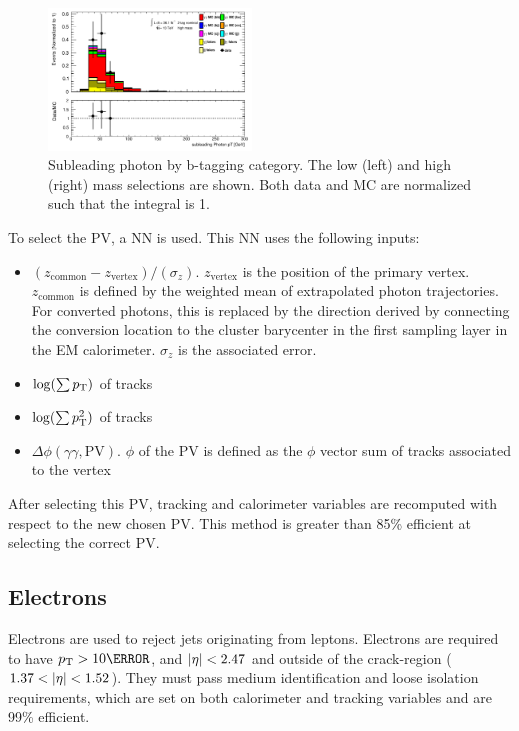 \begin{figure}[p]
  \includegraphics[width=0.48\textwidth]{chapters/chapter5_yybb/images/data_MC_comparison/h_SR_h_2t_nominal_subleadingPhoton_pt.pdf}
  \caption[Subleading photon \pt.]{Subleading photon \pt by b-tagging category. The low (left) and high (right) mass selections are shown. Both data and MC are normalized such that the integral is 1.
  \label{fig:photon_s_pt}}
\end{figure}

To select the \gls{PV}, a \gls{NN} is used. This \gls{NN} uses the following inputs:
\begin{itemize}
  \item $(z_{\text{common}} - z_{\text{vertex}})/(\sigma_z)$. $z_{\text{vertex}}$ is the position of the primary vertex. $z_{\text{common}}$ is defined by the weighted mean of extrapolated photon trajectories. For converted photons, this is replaced by the direction derived by connecting the conversion location to the cluster barycenter in the first sampling layer in the \gls{EM} calorimeter. $\sigma_z$ is the associated error.
  \item $\log(\sum p_{\text{T}})$ of tracks
  \item $\log(\sum p_{\text{T}}^2)$ of tracks
  \item $\Delta \phi(\gamma\gamma,\text{PV})$. $\phi$ of the \gls{PV} is defined as the $\phi$ vector sum of tracks associated to the vertex
  
\end{itemize}
After selecting this \gls{PV}, tracking and calorimeter variables are recomputed with respect to the new chosen \gls{PV}. This method is greater than 85\% efficient at selecting the correct \gls{PV}.


\subsection{Electrons}

Electrons are used to reject jets originating from leptons. Electrons are required to have $\pt > \unit{10}{\GeV}$, and $|\eta| < 2.47$ and outside of the crack-region ($1.37 < |\eta| < 1.52$). They must pass medium identification and loose isolation requirements, which are set on both calorimeter and tracking variables and are 99\% efficient.

